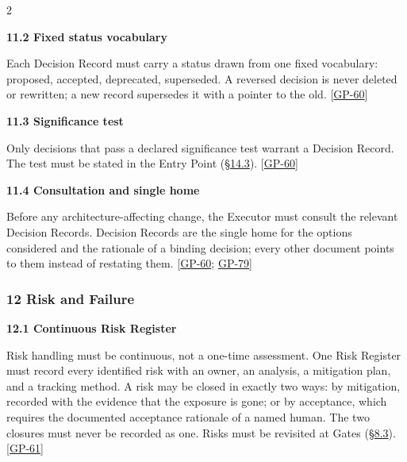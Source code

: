 \begin{multicols}{2}
\hypertarget{nss-11.2}{}

\par\smallskip\noindent\textbf{11.2 Fixed status vocabulary}\par\nopagebreak

Each Decision Record must carry a status drawn from one fixed vocabulary: proposed, accepted, deprecated, superseded. A reversed decision is never deleted or rewritten; a new record supersedes it with a pointer to the old. [\hyperlink{gp-60}{GP-60}]

\hypertarget{nss-11.3}{}

\par\smallskip\noindent\textbf{11.3 Significance test}\par\nopagebreak

Only decisions that pass a declared significance test warrant a Decision Record. The test must be stated in the Entry Point (\hyperlink{nss-14.3}{\S14.3}). [\hyperlink{gp-60}{GP-60}]

\hypertarget{nss-11.4}{}

\par\smallskip\noindent\textbf{11.4 Consultation and single home}\par\nopagebreak

Before any architecture-affecting change, the Executor must consult the relevant Decision Records. Decision Records are the single home for the options considered and the rationale of a binding decision; every other document points to them instead of restating them. [\hyperlink{gp-60}{GP-60}; \hyperlink{gp-79}{GP-79}]

\hypertarget{nss-12}{}

\subsubsection*{12 Risk and Failure}

\hypertarget{nss-12.1}{}

\par\smallskip\noindent\textbf{12.1 Continuous Risk Register}\par\nopagebreak

Risk handling must be continuous, not a one-time assessment. One Risk Register must record every identified risk with an owner, an analysis, a mitigation plan, and a tracking method. A risk may be closed in exactly two ways: by mitigation, recorded with the evidence that the exposure is gone; or by acceptance, which requires the documented acceptance rationale of a named human. The two closures must never be recorded as one. Risks must be revisited at Gates (\hyperlink{nss-8.3}{\S8.3}). [\hyperlink{gp-61}{GP-61}]


\end{multicols}
